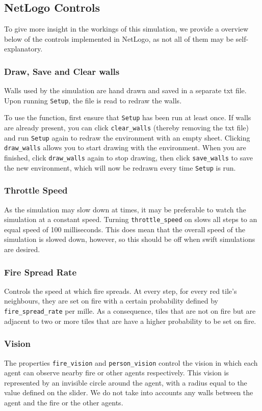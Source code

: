 \documentclass[a4paper]{article}
\begin{document}
\subsection{NetLogo Controls}
To give more insight in the workings of this simulation, we provide a overview below of the controls implemented in NetLogo, as not all of them may be self-explanatory.

\subsubsection{Draw, Save and Clear walls}
Walls used by the simulation are hand drawn and saved in a separate txt file. Upon running \texttt{Setup}, the file is read to redraw the walls.

To use the function, first ensure that \texttt{Setup} has been run at least once. If walls are already present, you can click \texttt{clear\_walls} (thereby removing the txt file) and run \texttt{Setup} again to redraw the environment with an empty sheet. Clicking \texttt{draw\_walls} allows you to start drawing with the environment. When you are finished, click \texttt{draw\_walls} again to stop drawing, then click \texttt{save\_walls} to save the new environment, which will now be redrawn every time \texttt{Setup} is run.

\subsubsection{Throttle Speed}
As the simulation may slow down at times, it may be preferable to watch the simulation at a constant speed. Turning \texttt{throttle\_speed} on slows all steps to an equal speed of 100 milliseconds. This does mean that the overall speed of the simulation is slowed down, however, so this should be off when swift simulations are desired.

\subsubsection{Fire Spread Rate}
Controls the speed at which fire spreads. At every step, for every red tile's neighbours, they are set on fire with a certain probability defined by \texttt{fire\_spread\_rate} per mille. As a consequence, tiles that are not on fire but are adjacent to two or more tiles that are have a higher probability to be set on fire.

\subsubsection{Vision}
The properties \texttt{fire\_vision} and \texttt{person\_vision} control the vision in which each agent can observe nearby fire or other agents respectively. This vision is represented by an invisible circle around the agent, with a radius equal to the value defined on the slider. We do not take into accounts any walls between the agent and the fire or the other agents.
\end{document}
